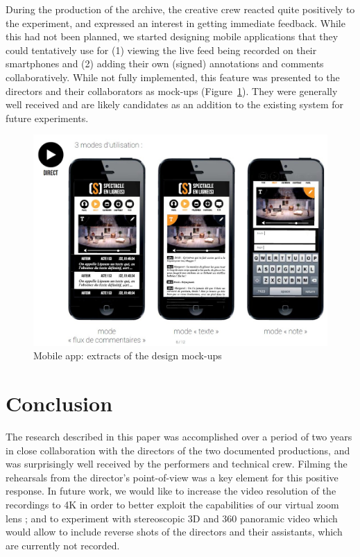 \documentclass[conference]{IEEEtran}
\begin{document}
During the production of the archive, the creative crew reacted quite positively to the experiment, and expressed an interest in getting immediate feedback. While this had not been planned, we started designing mobile applications that they could tentatively use for (1) viewing the live feed being recorded on their smartphones and (2) adding their own (signed) annotations and comments collaboratively.  While not fully implemented, this feature was presented to the directors and their collaborators as mock-ups (Figure~\ref{fig:mobileapp}). They were generally well received and are likely candidates  as an addition to the existing system for future experiments. 

\begin{figure}[htb!]
  \centering
  \includegraphics[width=\columnwidth]{mobileapp}
  \caption{Mobile app: extracts of the design mock-ups}
  \label{fig:mobileapp}
\end{figure}


 


\section{Conclusion}
\label{sec:conclusion}

The research described in this paper was accomplished over a period of two years 
in close collaboration with the directors of the two documented productions, and was 
surprisingly  well received by the performers and technical crew. Filming the rehearsals
from the director's point-of-view was a key element for this positive response. In future work,
we would like to increase the video resolution of the recordings to 4K in order to better exploit
the capabilities of our virtual zoom lens ; and to experiment with stereoscopic 3D and 360 panoramic video
which would allow to include reverse shots of the directors and their assistants, which are currently not recorded.
\end{document}
